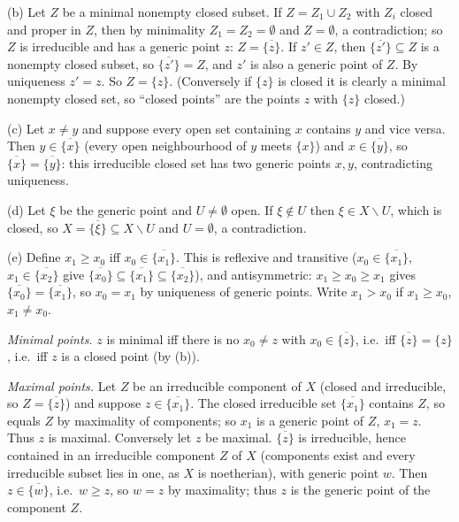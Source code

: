 \documentclass[11pt]{article}
\begin{document}
(b) Let $Z$ be a minimal nonempty closed subset. If $Z=Z_1\cup Z_2$ with $Z_i$ closed and proper in $Z$, then by minimality $Z_1=Z_2=\emptyset$ and $Z=\emptyset$, a contradiction; so $Z$ is irreducible and has a generic point $z$: $Z=\overline{\{z\}}$. If $z'\in Z$, then $\overline{\{z'\}}\subseteq Z$ is a nonempty closed subset, so $\overline{\{z'\}}=Z$, and $z'$ is also a generic point of $Z$. By uniqueness $z'=z$. So $Z=\{z\}$. (Conversely if $\{z\}$ is closed it is clearly a minimal nonempty closed set, so ``closed points'' are the points $z$ with $\{z\}$ closed.)

(c) Let $x\ne y$ and suppose every open set containing $x$ contains $y$ and vice versa. Then $y\in\overline{\{x\}}$ (every open neighbourhood of $y$ meets $\{x\}$) and $x\in\overline{\{y\}}$, so $\overline{\{x\}}=\overline{\{y\}}$: this irreducible closed set has two generic points $x,y$, contradicting uniqueness.

(d) Let $\xi$ be the generic point and $U\ne\emptyset$ open. If $\xi\notin U$ then $\xi\in X\smallsetminus U$, which is closed, so $X=\overline{\{\xi\}}\subseteq X\smallsetminus U$ and $U=\emptyset$, a contradiction.

(e) Define $x_1\ge x_0$ iff $x_0\in\overline{\{x_1\}}$. This is reflexive and transitive ($x_0\in\overline{\{x_1\}}$, $x_1\in\overline{\{x_2\}}$ give $\overline{\{x_0\}}\subseteq\overline{\{x_1\}}\subseteq\overline{\{x_2\}}$), and antisymmetric: $x_1\ge x_0\ge x_1$ gives $\overline{\{x_0\}}=\overline{\{x_1\}}$, so $x_0=x_1$ by uniqueness of generic points. Write $x_1>x_0$ if $x_1\ge x_0$, $x_1\ne x_0$.

\emph{Minimal points.} $z$ is minimal iff there is no $x_0\ne z$ with $x_0\in\overline{\{z\}}$, i.e.\ iff $\overline{\{z\}}=\{z\}$, i.e.\ iff $z$ is a closed point (by (b)).

\emph{Maximal points.} Let $Z$ be an irreducible component of $X$ (closed and irreducible, so $Z=\overline{\{z\}}$) and suppose $z\in\overline{\{x_1\}}$. The closed irreducible set $\overline{\{x_1\}}$ contains $Z$, so equals $Z$ by maximality of components; so $x_1$ is a generic point of $Z$, $x_1=z$. Thus $z$ is maximal. Conversely let $z$ be maximal. $\overline{\{z\}}$ is irreducible, hence contained in an irreducible component $Z$ of $X$ (components exist and every irreducible subset lies in one, as $X$ is noetherian), with generic point $w$. Then $z\in\overline{\{w\}}$, i.e.\ $w\ge z$, so $w=z$ by maximality; thus $z$ is the generic point of the component $Z$.
\end{document}
